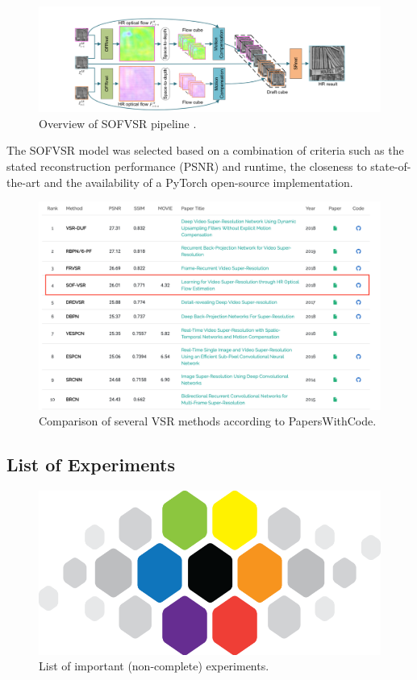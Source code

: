 \begin{figure}[!ht]
	\centering
	\includegraphics[width=14cm]{figures/sofvsr}
	\caption{Overview of SOFVSR pipeline \cite{LFVSRTHROFE}.}
  \label{fig:sofvsr}
\end{figure}

The SOFVSR model was selected based on a combination of criteria such as the
stated reconstruction performance (PSNR) and runtime, the closeness to
state-of-the-art and the availability of a PyTorch open-source implementation.

\begin{figure}[!ht]
	\centering
	\includegraphics[width=14cm]{figures/sofvsr_selection}
	\caption{Comparison of several \ac{VSR} methods according to PapersWithCode.}
  \label{fig:sofvsr_selection}
\end{figure}

\subsection*{List of Experiments}

\begin{figure}[!ht]
	\centering
	\includegraphics[width=14cm]{figures/cvl}
	\caption{List of important (non-complete) experiments.}
  \label{fig:experiments}
\end{figure}

